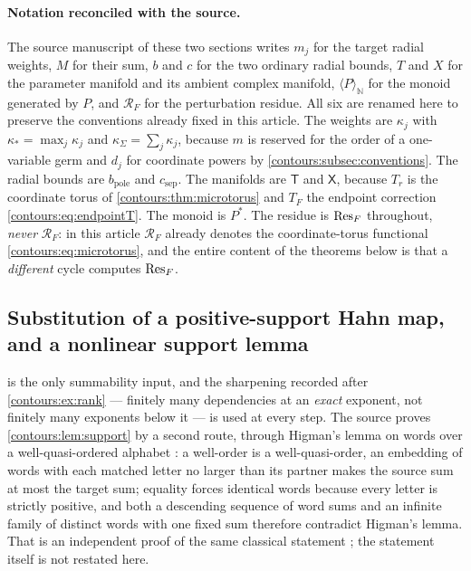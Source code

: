 \documentclass[11pt,letterpaper]{article}
\theoremstyle{definition}
\theoremstyle{remark}
\newcommand{\N}{\mathbb N}\newcommand{\Z}{\mathbb Z}\newcommand{\DD}{\mathbb D}
\numberwithin{equation}{section}
\begin{document}
\paragraph{Notation reconciled with the source.}
The source manuscript of these two sections writes $m_j$ for the target radial
weights, $M$ for their sum, $b$ and $c$ for the two ordinary radial bounds,
$T$ and $X$ for the parameter manifold and its ambient complex manifold,
$\langle P\rangle_\N$ for the monoid generated by $P$, and $\mathcal R_F$ for
the perturbation residue. All six are renamed here to preserve the conventions
already fixed in this article. The weights are $\kappa_j$ with
$\kappa_*=\max_j\kappa_j$ and $\kappa_\Sigma=\sum_j\kappa_j$, because $m$ is
reserved for the order of a one-variable germ and $d_j$ for coordinate powers
by \cref{contours:subsec:conventions}. The radial bounds are
$b_{\mathrm{pole}}$ and $c_{\mathrm{sep}}$. The manifolds are $\mathsf T$ and
$\mathsf X$, because $T_r$ is the coordinate torus of
\cref{contours:thm:microtorus} and $T_F$ the endpoint correction
\eqref{contours:eq:endpointT}. The monoid is $P^*$. The residue is
$\operatorname{Res}_F$ throughout, \emph{never} $\mathcal R_F$: in this article
$\mathcal R_F$ already denotes the coordinate-torus functional
\eqref{contours:eq:microtorus}, and the entire content of the theorems below is
that a \emph{different} cycle computes $\operatorname{Res}_F$.

\subsection{Substitution of a positive-support Hahn map, and a nonlinear
support lemma}
\label{contours:subsec:hahnsub}
 is the only summability input, and the sharpening
recorded after \cref{contours:ex:rank} --- finitely many dependencies at an
\emph{exact} exponent, not finitely many exponents below it --- is used at every
step. The source proves \cref{contours:lem:support} by a second route, through
Higman's lemma on words over a well-quasi-ordered alphabet \cite{Higman}: a
well-order is a well-quasi-order, an embedding of words with each matched letter
no larger than its partner makes the source sum at most the target sum;
equality forces identical words because every letter is strictly positive, and both a descending
sequence of word sums and an infinite family of distinct words with one fixed sum
therefore contradict Higman's lemma. That is an independent proof of the same
classical statement \cite{Neumann,Higman}; the statement itself is not restated
here.
\end{document}
